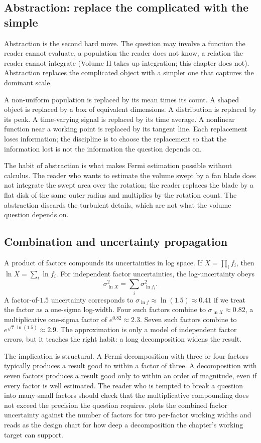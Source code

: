 \subsection{Abstraction: replace the complicated with the simple}

Abstraction is the second hard move. The question may involve a
function the reader cannot evaluate, a population the reader does not
know, a relation the reader cannot integrate (Volume II takes up
integration; this chapter does not). Abstraction replaces the
complicated object with a simpler one that captures the dominant scale.

A non-uniform population is replaced by its mean times its count. A
shaped object is replaced by a box of equivalent dimensions. A
distribution is replaced by its peak. A time-varying signal is
replaced by its time average. A nonlinear function near a working
point is replaced by its tangent line. Each replacement loses
information; the discipline is to choose the replacement so that the
information lost is not the information the question depends on.

The habit of abstraction is what makes Fermi estimation possible
without calculus. The reader who wants to estimate the volume swept by
a fan blade does not integrate the swept area over the rotation; the
reader replaces the blade by a flat disk of the same outer radius and
multiplies by the rotation count. The abstraction discards the
turbulent details, which are not what the volume question depends on.

\subsection{Combination and uncertainty propagation}

A product of factors compounds its uncertainties in log space. If
$X = \prod_{i} f_{i}$, then $\ln X = \sum_{i} \ln f_{i}$. For
independent factor uncertainties, the log-uncertainty obeys
\[
\sigma_{\ln X}^{2} = \sum_{i} \sigma_{\ln f_{i}}^{2}.
\]
A factor-of-$1.5$ uncertainty corresponds to $\sigma_{\ln f} \approx
\ln(1.5) \approx 0.41$ if we treat the factor as a one-sigma log-width.
Four such factors combine to $\sigma_{\ln X} \approx 0.82$, a
multiplicative one-sigma factor of $e^{0.82} \approx 2.3$. Seven such
factors combine to $e^{\sqrt{7}\,\ln(1.5)} \approx 2.9$. The
approximation is only a model of independent factor errors, but it
teaches the right habit: a long decomposition widens the result.

The implication is structural. A Fermi decomposition with three or
four factors typically produces a result good to within a factor of
three. A decomposition with seven factors produces a result good only
to within an order of magnitude, even if every factor is well
estimated. The reader who is tempted to break a question into many
small factors should check that the multiplicative compounding does
not exceed the precision the question requires.
 plots the combined factor
uncertainty against the number of factors for two per-factor working
widths and reads as the design chart for how deep a decomposition the
chapter's working target can support.

